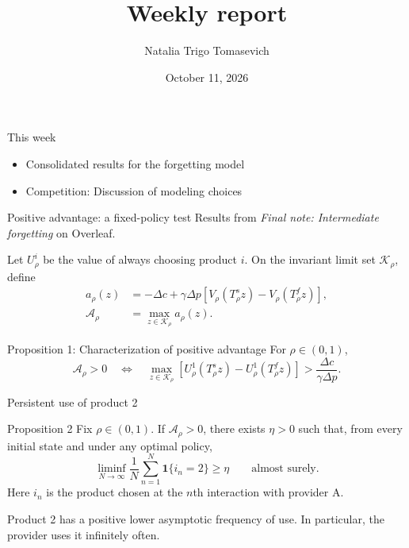 \documentclass[10pt]{beamer}
\title{Weekly report}
\author{Natalia Trigo Tomasevich}
\date{October 11, 2026}
\begin{document}
\frame{\titlepage}

\begin{frame}{This week}
    \begin{itemize}[<+->]
        \item Consolidated results for the forgetting model
        \item Competition: Discussion of modeling choices 
    \end{itemize}
\end{frame}


\begin{frame}{Positive advantage: a fixed-policy test}
    Results from \emph{Final note: Intermediate forgetting} on Overleaf.

    \medskip
    Let $U_\rho^i$ be the value of always
    choosing product $i$. On the invariant limit set $\mathcal K_\rho$, define
    \begin{align}
        a_\rho(z)&=-\Delta c+\gamma\Delta p
        [V_\rho(T_\rho^s z)-V_\rho(T_\rho^f z)],\\
        \mathcal A_\rho&=\max_{z\in\mathcal K_\rho}a_\rho(z).
    \end{align}
    
    \begin{block}{Proposition 1: Characterization of positive advantage}
        For $\rho\in(0,1)$,
        \[
        \mathcal A_\rho>0
        \quad\Longleftrightarrow\quad
        \max_{z\in\mathcal K_\rho}
        [U_\rho^1(T_\rho^s z)-U_\rho^1(T_\rho^f z)]
        >\frac{\Delta c}{\gamma\Delta p}.
        \]
    \end{block}
\end{frame}

\begin{frame}{Persistent use of product 2}
    \begin{block}{Proposition 2}
        Fix $\rho\in(0,1)$. If $\mathcal A_\rho>0$, there exists
        $\eta>0$ such that, from every initial state and under any
        optimal policy,
        \[
        \liminf_{N\to\infty}\frac{1}{N}
        \sum_{n=1}^{N}\mathbf 1\{i_n=2\}
        \ge\eta
        \qquad\text{almost surely}.
        \]
        Here $i_n$ is the product chosen at the $n$th interaction
        with provider A.
    \end{block}

    \medskip
    Product 2 has a positive lower asymptotic frequency of use.
    In particular, the provider uses it infinitely often.
\end{frame}
\end{document}
